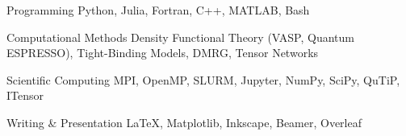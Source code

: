 

\begin{cvskills}


\cvskill
{Programming}
{Python, Julia, Fortran, C++, MATLAB, Bash}

\cvskill
{Computational Methods}
{Density Functional Theory (VASP, Quantum ESPRESSO), Tight-Binding Models, DMRG, Tensor Networks}

\cvskill
{Scientific Computing}
{MPI, OpenMP, SLURM, Jupyter, NumPy, SciPy, QuTiP, ITensor}

\cvskill
{Writing \& Presentation}
{LaTeX, Matplotlib, Inkscape, Beamer, Overleaf}


\end{cvskills}
